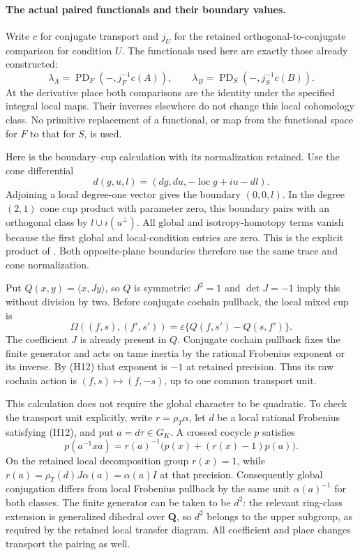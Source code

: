 \paragraph{The actual paired functionals and their boundary values.}
Write $c$ for conjugate transport and $j_U$ for the retained
orthogonal-to-conjugate comparison for condition $U$. The functionals
used here are exactly those already constructed:
\[
 \lambda_A=\operatorname{PD}_F(-,j_F^{-1}c(A)),\qquad
 \lambda_B=\operatorname{PD}_S(-,j_S^{-1}c(B)).
\]
At the derivative place both comparisons are the identity under the
specified integral local maps. Their inverses elsewhere do not change
this local cohomology class. No primitive replacement of a functional,
or map from the functional space for $F$ to that for $S$, is used.

Here is the boundary--cup calculation with its normalization retained.
Use the cone differential
\[
 d(g,u,l)=(dg,du,-\operatorname{loc}g+iu-dl).
\]
Adjoining a local degree-one vector gives the boundary $(0,0,l)$.
In the degree $(2,1)$ cone cup product with parameter zero, this
boundary pairs with an orthogonal class by $l\cup i(u^\perp)$.
All global and isotropy-homotopy terms vanish because the first global
and local-condition entries are zero. This is the explicit product
of \cite[Proposition 1.3.2 and Sections 6.2.2--6.2.4, 6.3.3]{nekovar}.
Both opposite-plane boundaries therefore use the same trace and cone
normalization.

Put $Q(x,y)=\langle x,Jy\rangle$, so $Q$ is symmetric:
$J^2=1$ and $\det J=-1$ imply this without division by two.
Before conjugate cochain pullback, the local mixed cup is
\[
 \Omega((f,s),(f',s'))
   =\varepsilon\{Q(f,s')-Q(s,f')\}.
\]
The coefficient $J$ is already present in $Q$.
Conjugate cochain pullback fixes the finite generator and acts on
tame inertia by the rational Frobenius exponent or its inverse.
By (H12) that exponent is $-1$ at retained precision. Thus its raw
cochain action is $(f,s)\mapsto(f,-s)$, up to one common transport unit.

This calculation does not require the global character to be quadratic.
To check the transport unit explicitly, write $r=\rho_T\alpha$, let
$d$ be a local rational Frobenius satisfying (H12), and put
$a=d\tau\in G_K$. A crossed cocycle $p$ satisfies
\[
 p(a^{-1}xa)=r(a)^{-1}
       \bigl(p(x)+(r(x)-1)p(a)\bigr).
\]
On the retained local decomposition group $r(x)=1$, while
$r(a)=\rho_T(d)J\alpha(a)=\alpha(a)I$ at that precision.
Consequently global conjugation differs from local Frobenius pullback
by the same unit $\alpha(a)^{-1}$ for both classes. The finite
generator can be taken to be $d^2$: the relevant ring-class extension
is generalized dihedral over $\mathbf Q$, so $d^2$ belongs to the
upper subgroup, as required by the retained local transfer diagram.
All coefficient and place changes transport the pairing as well.

